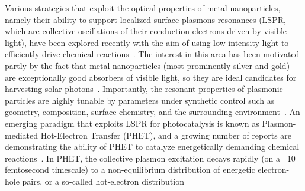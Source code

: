 \documentclass[journal=jpclcd,manuscript=letter]{achemso}
\begin{document}
Various strategies that exploit the optical properties of metal nanoparticles, namely their ability to support localized surface plasmons resonances (LSPR, which are collective oscillations of their 
conduction electrons driven by visible light), have been explored recently with the aim of using low-intensity light to efficiently drive chemical 
reactions~\cite{LCI_NatureMater_2011,KAC_ACSCatalysis_2013,ZLQ_RSCAdvances_2015,PKL_AccChemRes_2015}.  The interest in this area has 
been motivated partly by the fact that metal nanoparticles (most prominently silver and gold) are exceptionally good absorbers of visible light, 
so they are ideal candidates for harvesting solar photons~\cite{AP_NatMat_2010}.  
Importantly, the resonant properties of plasmonic particles are highly tunable by parameters under synthetic control such as geometry, composition, surface chemistry, and the surrounding 
environment~\cite{SX_Science_2002,BCN_ChemRev_2005,GB_NatPhoton_2010}.  An emerging paradigm that exploits LSPR for photocatalysis is known as Plasmon-mediated Hot-Electron Transfer (PHET),
and a growing number of reports are demonstrating the ability of PHET to catalyze energetically demanding chemical 
reactions~\cite{CXL_NatureChem_2011,MZL_Science_2013,MLL_NanoLett_2013,LFP_AC_2015,ZHX_NatPhoton_2016,ZJM_ACSNano_2016,SZZ_PNAS_2016,SCR_JPCC_2016}.
In PHET, the collective plasmon excitation decays rapidly (on a ~10 femtosecond timescale) to a non-equilibrium distribution of energetic electron-hole pairs, or a so-called hot-electron 
distribution~\cite{KAC_ACSCatalysis_2013,GZG_JPCC_2013,SNJ_NatComm_2014,WCM_Science_2015,MWW_NatComm_2015, BSN_ACSNano_2016}  
\end{document}

